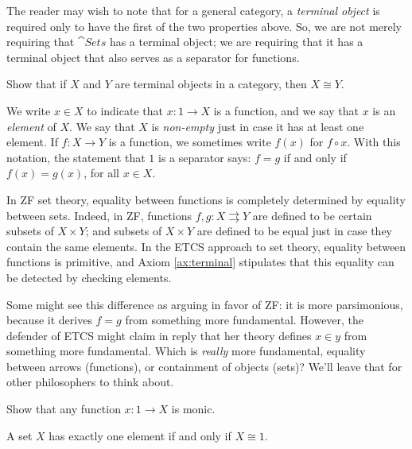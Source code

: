 
The reader may wish to note that for a general category, a
\emph{terminal object} is required only to have the first of the two
properties above.  So, we are not merely requiring that $\cat{Sets}$
has a terminal object; we are requiring that it has a terminal object
that also serves as a separator for functions.

\begin{exercise} Show that if $X$ and $Y$ are terminal objects in a
  category, then $X\cong Y$.  \end{exercise}

\begin{defn} We write $x\in X$ to indicate that $x:1\to X$ is a
  function, and we say that $x$ is an \emph{element} of $X$.  We say
  that $X$ is \emph{non-empty} just in case it has at least one
  element.  If $f:X\to Y$ is a function, we sometimes write $f(x)$ for
  $f\circ x$.  With this notation, the statement that $1$ is a
  separator says: $f=g$ if and only if $f(x)=g(x)$, for all $x\in X$.
\end{defn}

\begin{disc} In ZF set theory, equality between functions is
  completely determined by equality between sets.  Indeed, in ZF,
  functions $f,g:X\rightrightarrows Y$ are defined to be certain
  subsets of $X\times Y$; and subsets of $X\times Y$ are defined to be
  equal just in case they contain the same elements.  In the ETCS
  approach to set theory, equality between functions is primitive, and
  Axiom \ref{ax:terminal} stipulates that this equality can be
  detected by checking elements. 

  Some might see this difference as arguing in favor of ZF: it is more
  parsimonious, because it derives $f=g$ from something more
  fundamental.  However, the defender of ETCS might claim in reply
  that her theory defines $x\in y$ from something more fundamental.
  Which is {\it really} more fundamental, equality between arrows
  (functions), or containment of objects (sets)?  We'll leave that for
  other philosophers to think about. \end{disc}

\begin{exercise} Show that any function $x:1\to X$ is
  monic. \end{exercise}

\begin{prop} A set $X$ has exactly one element if and only if $X\cong
  1$. \end{prop}

